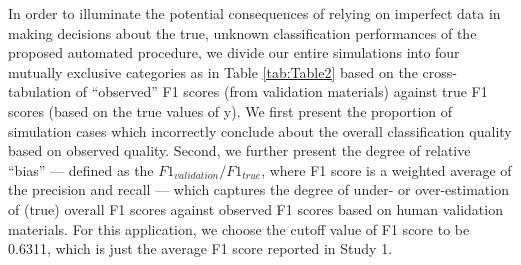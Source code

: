 \documentclass[man, floatsintext, 12pt, a4paper, noextraspace]{apa6}
\begin{document}
    In order to illuminate the potential consequences of relying on imperfect data in making decisions about the true, unknown classification performances of the proposed automated procedure, we divide our entire simulations into four mutually exclusive categories as in Table \ref{tab:Table2} based on the cross-tabulation of \enquote{observed} F1 scores (from validation materials) against true F1 scores (based on the true values of y). We first present the proportion of simulation cases which incorrectly conclude about the overall classification quality based on observed quality. Second, we further present the degree of relative \enquote{bias} --- defined as the $ F1_{validation}/F1_{true} $, where F1 score is a weighted average of the precision and recall --- which captures the degree of under- or over-estimation of (true) overall F1 scores against observed F1 scores based on human validation materials. For this application, we choose the cutoff value of F1 score to be 0.6311, which is just the average F1 score reported in Study 1. 
\end{document}
